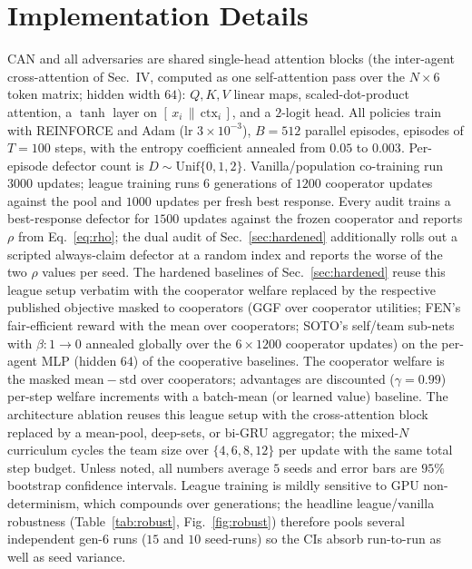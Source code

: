 \documentclass[conference, a4paper]{IEEEtran}
\begin{document}
\section{Implementation Details}
CAN and all adversaries are shared single-head attention blocks (the inter-agent
cross-attention of Sec.~IV, computed as one self-attention pass over the
$N{\times}6$ token matrix; hidden width $64$): $Q,K,V$ linear maps,
scaled-dot-product attention, a $\tanh$ layer on $[\,x_i\,\|\,\mathrm{ctx}_i\,]$,
and a $2$-logit head.
All policies train with REINFORCE and Adam (lr $3\times10^{-3}$), $B{=}512$
parallel episodes, episodes of $T{=}100$ steps, with the entropy coefficient
annealed from $0.05$ to $0.003$. Per-episode defector count is
$D\sim\mathrm{Unif}\{0,1,2\}$. Vanilla/population co-training run $3000$ updates;
league training runs $6$ generations of $1200$ cooperator updates against the pool
and $1000$ updates per fresh best response. Every audit trains a best-response
defector for $1500$ updates against the frozen cooperator and reports $\rho$ from
Eq.~\eqref{eq:rho}; the dual audit of Sec.~\ref{sec:hardened} additionally rolls
out a scripted always-claim defector at a random index and reports the worse of
the two $\rho$ values per seed. The hardened baselines of Sec.~\ref{sec:hardened}
reuse this league setup verbatim with the cooperator welfare replaced by the
respective published objective masked to cooperators (GGF over cooperator
utilities; FEN's fair-efficient reward with the mean over cooperators; SOTO's
self/team sub-nets with $\beta{:}1{\to}0$ annealed globally over the
$6\times1200$ cooperator updates) on the per-agent MLP (hidden $64$) of the
cooperative baselines. The cooperator welfare is the masked
$\mathrm{mean}{-}\mathrm{std}$ over cooperators; advantages are discounted
($\gamma{=}0.99$) per-step welfare increments with a batch-mean (or learned value)
baseline. The architecture ablation reuses this league setup with the
cross-attention block replaced by a mean-pool, deep-sets, or bi-GRU aggregator; the
mixed-$N$ curriculum cycles the team size over $\{4,6,8,12\}$ per update with the
same total step budget. Unless noted, all numbers average $5$ seeds and error bars
are $95\%$ bootstrap confidence intervals. League training is mildly sensitive to GPU
non-determinism, which compounds over generations; the headline league/vanilla
robustness (Table~\ref{tab:robust}, Fig.~\ref{fig:robust}) therefore pools several
independent gen-6 runs ($15$ and $10$ seed-runs) so the CIs absorb run-to-run as well
as seed variance.



\end{document}
